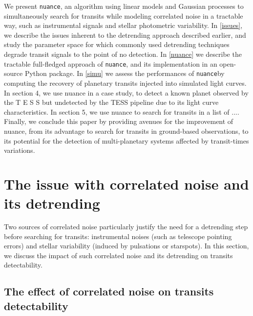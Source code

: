 \documentclass{aastex631}
\newcommand{\nuance}{\texttt{nuance}}
\begin{document}
We present \nuance, an algorithm using linear models and Gaussian processes to simultaneously search for transits while modeling correlated noise in a tractable way, such as instrumental signals and stellar photometric variability. In \autoref{issues}, we describe the issues inherent to the detrending approach described earlier, and study the parameter space for which commonly used detrending techniques degrade transit signals to the point of no detection. In \autoref{nuance} we describe the tractable full-fledged approach of  \nuance, and its implementation in an open-source Python package. In \autoref{simu} we assess the performances of \nuance by computing the recovery of planetary transits injected into simulated light curves. In section 4, we use nuance in a case study, to detect a known planet observed by the T E S S but undetected by the TESS pipeline due to its light curve characteristics. In section 5, we use nuance to search for transits in a list of .... Finally, we conclude this paper by providing avenues for the improvement of nuance, from its advantage to search for transits in ground-based observations, to its potential for the detection of multi-planetary systems affected by transit-times variations.

\section{The issue with correlated noise and its detrending}\label{issues}
Two sources of correlated noise particularly justify the need for a detrending step before searching for transits: instrumental noises (such as telescope pointing errors) and stellar variability (induced by pulsations or starspots). In this section, we discuss the impact of such correlated noise and its detrending on transits detectability.

\subsection{The effect  of correlated noise on transits detectability}
\end{document}
